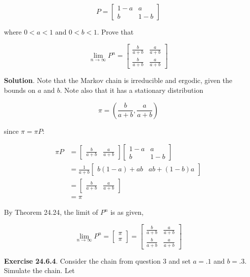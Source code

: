 \[ P = \begin{bmatrix}
1 - a & a \\
b & 1 - b
\end{bmatrix} \]

where \(0 < a < 1\) and \(0 < b < 1\). Prove that

\[ \lim_{n \rightarrow \infty} P^{n} = \begin{bmatrix}
\frac{b}{a + b} & \frac{a}{a + b} \\
\frac{b}{a + b} & \frac{a}{a + b}
\end{bmatrix} \]

\textbf{Solution}. Note that the Markov chain is irreducible and
ergodic, given the bounds on \(a\) and \(b\). Note also that it has a
stationary distribution

\[ \pi = \left( \frac{b}{a + b}, \frac{a}{a + b} \right) \]

since \(\pi = \pi P\):

\begin{align*}
\pi P &= 
\begin{bmatrix} 
\frac{b}{a + b} & \frac{a}{a + b}
\end{bmatrix} \begin{bmatrix}
1 - a & a \\
b & 1 - b
\end{bmatrix} \\
&= \frac{1}{a + b} \begin{bmatrix}
 b (1 - a) + ab &
 ab + (1 - b) a 
\end{bmatrix} \\
&= \begin{bmatrix} \frac{b}{a + b} & \frac{a}{a + b} \end{bmatrix}\\
&= \pi
\end{align*}

By Theorem 24.24, the limit of \(P^{n}\) is as given,

\[ \lim_{n \rightarrow \infty} P^{n} = 
\begin{bmatrix}
\pi \\ \pi
\end{bmatrix}
=
\begin{bmatrix}
\frac{b}{a + b} & \frac{a}{a + b} \\
\frac{b}{a + b} & \frac{a}{a + b}
\end{bmatrix} \]

\textbf{Exercise 24.6.4}. Consider the chain from question 3 and set
\(a = .1\) and \(b = .3\). Simulate the chain. Let

